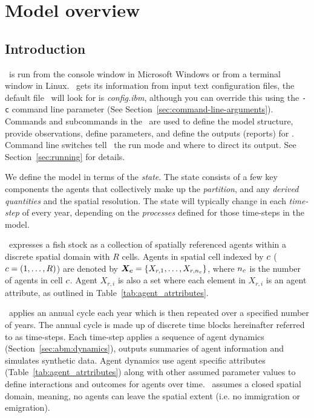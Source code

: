 \section{Model overview\label{sec:overview}}

\subsection{Introduction}

\IBM\ is run from the console window in Microsoft Windows or from a terminal window in Linux. \IBM\ gets its information from input text configuration files, the default file \IBM\ will look for is \emph{config.ibm}, although you can override this using the \texttt{-c} command line parameter (See Section~\ref{sec:command-line-arguments}). Commands and subcommands in the \config\ are used to define the model structure, provide observations, define parameters, and define the outputs (reports) for \IBM. Command line switches tell \IBM\ the run mode and where to direct its output. See Section~\ref{sec:running} for details.

We define the model in terms of the \emph{state}. The state consists of a few key components the agents that collectively make up the \emph{partition}, and any \emph{derived quantities} and the spatial resolution. The state will typically change in each \emph{time-step} of every year, depending on the \emph{processes} defined for those time-steps in the model. 


\IBM\ expresses a fish stock as a collection of spatially referenced agents within a discrete spatial domain with \(R\) cells. Agents in spatial cell indexed by \(c\) (\(c = (1,\dots,R)\)) are denoted by \(\bm{X_c} = \{X_{r,1}, \dots, X_{r, n_c}\}\), where \({n_c}\) is the number of agents in cell \(c\). Agent \(X_{r,i}\) is also a set where each element in \(X_{r,i}\) is an agent attribute, as outlined in Table~\ref{tab:agent_atrtributes}.


\IBM\ applies an annual cycle each year which is then repeated over a specified number of years. The annual cycle is made up of discrete time blocks hereinafter referred to as time-steps. Each time-step applies a sequence of agent dynamics (Section~\ref{sec:abm:dynamics}), outputs summaries of agent information and simulates synthetic data. Agent dynamics use agent specific attributes (Table~\ref{tab:agent_atrtributes}) along with other assumed parameter values to define interactions and outcomes for agents over time. \IBM\ assumes a closed spatial domain, meaning, no agents can leave the spatial extent (i.e. no immigration or emigration). 


